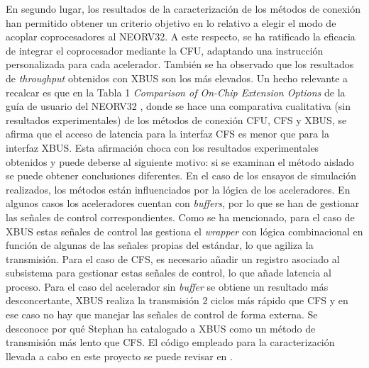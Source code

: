 En segundo lugar, los resultados de la caracterización de los métodos de conexión han permitido obtener un criterio objetivo en lo relativo a elegir el modo de acoplar coprocesadores al NEORV32.
A este respecto, se ha ratificado la eficacia de integrar el coprocesador mediante la CFU, adaptando una instrucción personalizada para cada acelerador.
También se ha observado que los resultados de \textit{throughput} obtenidos con XBUS son los más elevados.
Un hecho relevante a recalcar es que en la Tabla 1 \textit{Comparison of On-Chip Extension Options} de la guía de usuario del NEORV32 \cite{neorv32-ug}, donde se hace una comparativa cualitativa (sin resultados experimentales) de los métodos de conexión CFU, CFS y XBUS, se afirma que el acceso de latencia para la interfaz CFS es menor que para la interfaz XBUS.
Esta afirmación choca con los resultados experimentales obtenidos y puede deberse al siguiente motivo: si se examinan el método aislado se puede obtener conclusiones diferentes.
En el caso de los ensayos de simulación realizados, los métodos están influenciados por la lógica de los aceleradores. 
En algunos casos los aceleradores cuentan con \textit{buffers}, por lo que se han de gestionar las señales de control correspondientes.
Como se ha mencionado, para el caso de XBUS estas señales de control las gestiona el \textit{wrapper} con lógica combinacional en función de algunas de las señales propias del estándar, lo que agiliza la transmisión.
Para el caso de CFS, es necesario añadir un registro asociado al subsistema para gestionar estas señales de control, lo que añade latencia al proceso.
Para el caso del acelerador sin \textit{buffer} se obtiene un resultado más desconcertante, XBUS realiza la transmisión 2 ciclos más rápido que CFS y en ese caso no hay que manejar las señales de control de forma externa. 
Se desconoce por qué Stephan ha catalogado a XBUS como un método de transmisión más lento que CFS.
El código empleado para la caracterización llevada a cabo en este proyecto se puede revisar en \cite{gh:practices}.

